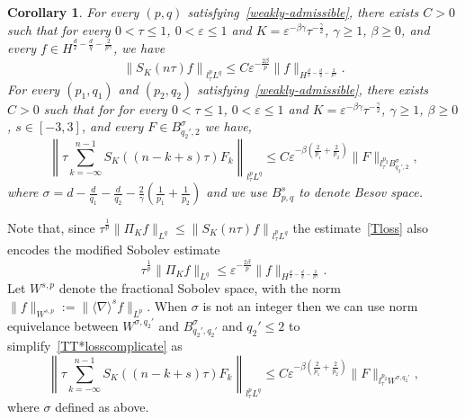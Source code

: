 \documentclass[10pt,a4paper]{article}
\newtheorem{corollary}[theorem]{Corollary}
\begin{document}
  \begin{corollary}\label{corDSE}
    For every \((p,q)\) satisfying~\eqref{weakly-admissible}, there exists \(C>0\) such that 
    for every \(0<\tau \leq 1\), \( 0 < \varepsilon \leq 1 \) and 
    \(K = \varepsilon^{-\beta\gamma}\tau^{-\frac\gamma2}\), \(\gamma \geq 1\), 
    \(\beta \geq 0\), and every \(f \in H^{\frac{d}2-\frac{d}q-\frac2{p\gamma}}\), we have
    \begin{equation}
    \label{Tloss}
      \left\| S_K (n\tau) f\right\|_{l^p_\tau L^q} \leq C \varepsilon^{-\frac{2\beta}p} 
      \|f \|_{H^{\frac{d}2-\frac{d}q-\frac2{p\gamma}}}. 
    \end{equation}
    For every \((p_1, q_1)\) and \((p_2, q_2)\) satisfying~\eqref{weakly-admissible}, 
    there exists \(C>0\) such that for 
    for every \(0<\tau \leq 1\), \( 0 < \varepsilon \leq 1 \) and 
    \(K = \varepsilon^{-\beta\gamma}\tau^{-\frac\gamma2}\), \(\gamma \geq 1\), 
    \(\beta \geq 0\), \(s \in [-3,3]\), and every \(F \in 
    B^{\sigma}_{q_2',2}\)
    we have,
    \begin{equation}
    \label{TT*losscomplicate}
      \left\| \tau \sum_{k=-\infty}^{n-1} S_K ((n-k+s)\tau) F_k \right\|_{l^p_\tau L^q} 
      \leq C \varepsilon^{-\beta(\frac2{p_1}+\frac2{p_2})} \|F\|_{l^{p_2}_\tau 
      B^{\sigma}_{q_2',2}},
    \end{equation}
    where \(\sigma=d-\frac{d}{q_1}-\frac{d}{q_2}-\frac2{\gamma}(\frac1{p_1}+\frac1{p_2})\)
    and we use \(B^s_{p,q}\) to denote Besov space.
  \end{corollary}
  Note that, since \(\tau^\frac1p\| \Pi_{K} f\|_{L^q} \leq  \left\| S_{K}(n \tau) f\right\|_{l^p_{\tau}L^q}\) 
  the estimate~\eqref{Tloss} also encodes the modified Sobolev estimate
  \begin{equation}
    \label{sobmod}
    \tau^\frac1p \|\Pi_K f\|_{L^q} \leq \varepsilon^{-\frac{2\beta}p} 
    \|f \|_{H^{\frac{d}2-\frac{d}q-\frac2{p\gamma}}}.
  \end{equation}
  Let \(W^{s,p}\) denote the fractional Sobolev space, with the norm
  \(\|f\|_{W^{s,p}} := \|\langle\nabla\rangle^s f\|_{L^p}\). When \(\sigma\) is 
  not an integer then we can use norm equivelance between \(W^{\sigma,q_2'}\) and 
  \(B^\sigma_{q_2',q_2'}\) and \(q_2' \leq 2\) to
  simplify~\eqref{TT*losscomplicate} as 
  \begin{equation}\label{TT*loss}
    \left\| \tau \sum_{k=-\infty}^{n-1} S_K ((n-k+s)\tau) F_k \right\|_{l^p_\tau L^q} 
    \leq C \varepsilon^{-\beta(\frac2{p_1}+\frac2{p_2})} \|F\|_{l^{p_2}_\tau 
    W^{\sigma,q_2'}},
  \end{equation}
  where \(\sigma\) defined as above.
\end{document}
